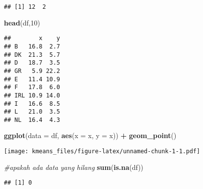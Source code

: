 \documentclass[]{article}
\newenvironment{Shaded}{\begin{snugshade}}{\end{snugshade}}
\newcommand{\CommentTok}[1]{\textcolor[rgb]{0.56,0.35,0.01}{\textit{#1}}}
\newcommand{\DataTypeTok}[1]{\textcolor[rgb]{0.13,0.29,0.53}{#1}}
\newcommand{\DecValTok}[1]{\textcolor[rgb]{0.00,0.00,0.81}{#1}}
\newcommand{\KeywordTok}[1]{\textcolor[rgb]{0.13,0.29,0.53}{\textbf{#1}}}
\newcommand{\NormalTok}[1]{#1}
\newcommand{\OperatorTok}[1]{\textcolor[rgb]{0.81,0.36,0.00}{\textbf{#1}}}
\newcommand{\StringTok}[1]{\textcolor[rgb]{0.31,0.60,0.02}{#1}}
\begin{document}
\begin{verbatim}
## [1] 12  2
\end{verbatim}

\begin{Shaded}
\begin{Highlighting}[]
\KeywordTok{head}\NormalTok{(df,}\DecValTok{10}\NormalTok{)}
\end{Highlighting}
\end{Shaded}

\begin{verbatim}
##        x    y
## B   16.8  2.7
## DK  21.3  5.7
## D   18.7  3.5
## GR   5.9 22.2
## E   11.4 10.9
## F   17.8  6.0
## IRL 10.9 14.0
## I   16.6  8.5
## L   21.0  3.5
## NL  16.4  4.3
\end{verbatim}

\begin{Shaded}
\begin{Highlighting}[]
\KeywordTok{ggplot}\NormalTok{(}\DataTypeTok{data =}\NormalTok{ df, }\KeywordTok{aes}\NormalTok{(}\DataTypeTok{x =}\NormalTok{ x, }\DataTypeTok{y =}\NormalTok{ x)) }\OperatorTok{+}
\StringTok{  }\KeywordTok{geom_point}\NormalTok{()}
\end{Highlighting}
\end{Shaded}

\texttt{[image: kmeans\_files/figure-latex/unnamed-chunk-1-1.pdf]}

\begin{Shaded}
\begin{Highlighting}[]
\CommentTok{#apakah ada data yang hilang}
\KeywordTok{sum}\NormalTok{(}\KeywordTok{is.na}\NormalTok{(df))}
\end{Highlighting}
\end{Shaded}

\begin{verbatim}
## [1] 0
\end{verbatim}

\begin{Shaded}
\end{Shaded}
\end{document}
